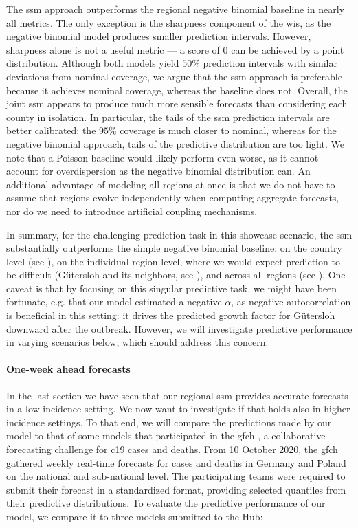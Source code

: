 The \gls{ssm} approach outperforms the regional negative binomial baseline in nearly all metrics. The only exception is the sharpness component of the \gls{wis}, as the negative binomial model produces smaller prediction intervals. However, sharpness alone is not a useful metric --- a score of $0$ can be achieved by a point distribution. Although both models yield $50\%$ prediction intervals with similar deviations from nominal coverage, we argue that the \gls{ssm} approach is preferable because it achieves nominal coverage, whereas the baseline does not.
Overall, the joint \gls{ssm} appears to produce much more sensible forecasts than considering each county in isolation. In particular, the tails of the \gls{ssm} prediction intervals are better calibrated: the $95\%$ coverage is much closer to nominal, whereas for the negative binomial approach, tails of the predictive distribution are too light. We note that a Poisson baseline would likely perform even worse, as it cannot account for overdispersion as the negative binomial distribution can. An additional advantage of modeling all regions at once is that we do not have to assume that regions evolve independently when computing aggregate forecasts, nor do we need to introduce artificial coupling mechanisms.

In summary, for the challenging prediction task in this showcase scenario, the \gls{ssm} substantially outperforms the simple negative binomial baseline: on the country level (see ), on the individual region level, where we would expect prediction to be difficult (Gütersloh and its neighbors, see ), and across all regions (see ). One caveat is that by focusing on this singular predictive task, we might have been fortunate, e.g. that our model estimated a negative $\alpha$, as negative autocorrelation is beneficial in this setting: it drives the predicted growth factor for Gütersloh downward after the outbreak. However, we will investigate predictive performance in varying scenarios below, which should address this concern.

\paragraph{One-week ahead forecasts}

In the last section we have seen that our regional \gls{ssm} provides accurate forecasts in a low incidence setting. We now want to investigate if that holds also in higher incidence settings.
To that end, we will compare the predictions made by our model to that of some models that participated in the \acrlong{gfch} \citep{Bracher2021Preregistered,Bracher2022National}, a collaborative forecasting challenge for \gls{c19} cases and deaths.
From 10 October 2020, the \gls{gfch} gathered weekly real-time forecasts for cases and deaths in Germany and Poland on the national and sub-national level. The participating teams were required to submit their forecast in a standardized format, providing selected quantiles from their predictive distributions. To evaluate the predictive performance of our model, we compare it to three models submitted to the Hub:

